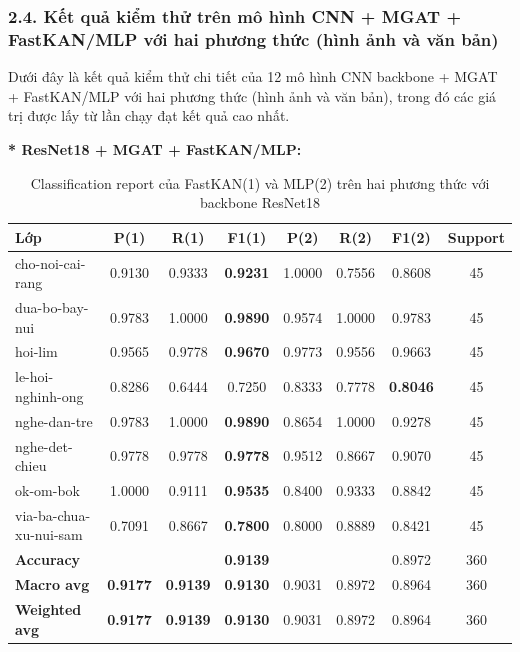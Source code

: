 \newpage
\subsubsection{2.4. Kết quả kiểm thử trên mô hình CNN + MGAT + FastKAN/MLP với hai phương thức (hình ảnh và văn bản)}
\indent\indent Dưới đây là kết quả kiểm thử chi tiết của 12 mô hình CNN backbone + MGAT + FastKAN/MLP với hai phương thức (hình ảnh và văn bản), trong đó các giá trị được lấy từ lần chạy đạt kết quả cao nhất.\vspace{0.3cm}

\textbf{* ResNet18 + MGAT + FastKAN/MLP:} 
\begin{table}[H]
\centering
\renewcommand{\arraystretch}{1.08}
\caption{\centering Classification report của FastKAN(1) và MLP(2) trên hai phương thức với backbone ResNet18}
\begin{tabular}{lccccccc}
\hline \textbf{Lớp} & \textbf{P(1)} & \textbf{R(1)} & \textbf{F1(1)} & \textbf{P(2)} & \textbf{R(2)} & \textbf{F1(2)} & \textbf{Support} \\ \hline

cho-noi-cai-rang
& 0.9130 & 0.9333 & \textbf{0.9231}
& 1.0000 & 0.7556 & 0.8608 & 45 \\

dua-bo-bay-nui
& 0.9783 & 1.0000 & \textbf{0.9890}
& 0.9574 & 1.0000 & 0.9783 & 45 \\

hoi-lim
& 0.9565 & 0.9778 & \textbf{0.9670}
& 0.9773 & 0.9556 & 0.9663 & 45 \\

le-hoi-nghinh-ong
& 0.8286 & 0.6444 & 0.7250
& 0.8333 & 0.7778 & \textbf{0.8046} & 45 \\

nghe-dan-tre
& 0.9783 & 1.0000 & \textbf{0.9890}
& 0.8654 & 1.0000 & 0.9278 & 45 \\

nghe-det-chieu
& 0.9778 & 0.9778 & \textbf{0.9778}
& 0.9512 & 0.8667 & 0.9070 & 45 \\

ok-om-bok
& 1.0000 & 0.9111 & \textbf{0.9535}
& 0.8400 & 0.9333 & 0.8842 & 45 \\

via-ba-chua-xu-nui-sam
& 0.7091 & 0.8667 & \textbf{0.7800}
& 0.8000 & 0.8889 & 0.8421 & 45 \\
\hline

\textbf{Accuracy}
& & & \textbf{0.9139}
& & & 0.8972 & 360 \\

\textbf{Macro avg}
& \textbf{0.9177} & \textbf{0.9139} & \textbf{0.9130}
& 0.9031 & 0.8972 & 0.8964 & 360 \\

\textbf{Weighted avg}
& \textbf{0.9177} & \textbf{0.9139} & \textbf{0.9130}
& 0.9031 & 0.8972 & 0.8964 & 360 \\
\hline
\end{tabular}
\end{table}

